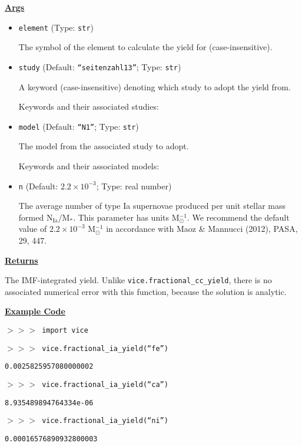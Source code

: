 \documentclass{report}
\begin{document}
\par\null\par\noindent 
\underline{\textbf{Args}} 
\begin{itemize} 
	\item{
		\texttt{element} (Type: \texttt{str}) 
		\par
		The symbol of the element to calculate the yield for (case-insensitive). 
	}

	\item{
		\texttt{study} (Default: \texttt{``seitenzahl13''}; Type: \texttt{str}) 
		\par 
		A keyword (case-insensitive) denoting which study to adopt the yield 
		from. 
		\par
		Keywords and their associated studies: 
	}

	\item{
		\texttt{model} (Default: \texttt{``N1''}; Type: \texttt{str}) 
		\par 
		The model from the associated study to adopt. 
		\par
		Keywords and their associated models: 
	}

	\item{
		\texttt{n} (Default: \texttt{$2.2\times10^{-3}$}; Type: real number) 
		\par 
		The average number of type Ia supernovae produced per unit stellar 
		mass formed N$_\text{Ia}$/M$_*$. This parameter has units 
		M$_\odot^{-1}$. We recommend the default value of $2.2\times10^{-3}$ 
		M$_\odot^{-1}$ in accordance with Maoz \& Mannucci (2012), PASA, 29, 
		447. 
	}
\end{itemize}

\par\null\par\noindent 
\underline{\textbf{Returns}} 
\par\noindent 
The IMF-integrated yield. Unlike \texttt{vice.fractional\_cc\_yield}, there is 
no associated numerical error with this function, because the solution is 
analytic. 

\par\null\par\noindent 
\underline{\textbf{Example Code}} 
\par\noindent 
\texttt{$>>>$ import vice} \par\noindent 
\texttt{$>>>$ vice.fractional\_ia\_yield(``fe'')} \par\noindent 
\texttt{0.0025825957080000002} \par\noindent 
\texttt{$>>>$ vice.fractional\_ia\_yield(``ca'')} \par\noindent 
\texttt{8.935489894764334e-06} \par\noindent 
\texttt{$>>>$ vice.fractional\_ia\_yield(``ni'')} \par\noindent 
\texttt{0.00016576890932800003} \par\noindent 
\end{document}
